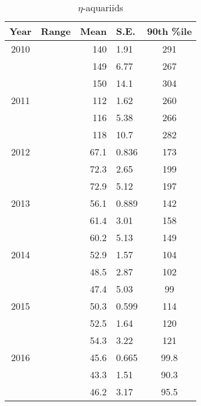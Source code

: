\begin{table}
	\centering
	\begin{tabular}{|c|c|r@{ \,$\pm$\, }l|c|}
		\hline 
		Year & Range & Mean & S.E. & 90th \%ile\\ 
		\hline 
		2010 & & 140 & 1.91 & 291   \\ 
		\hline 
		& &	149 & 6.77 & 267   \\ 
		\hline 
		& & 150 & 14.1 & 304   \\ 
		\hline 
		2011 & & 112 & 1.62 & 260   \\ 
		\hline 
		& & 116 & 5.38 & 266   \\ 
		\hline 
		& & 118 & 10.7 & 282   \\ 
		\hline 
		2012 & & 67.1 & 0.836 & 173   \\ 
		\hline 
		& & 72.3 & 2.65 & 199   \\ 
		\hline 
		& & 72.9 & 5.12 & 197   \\ 
		\hline 
		2013 & & 56.1 & 0.889 & 142   \\ 
		\hline 
		& & 61.4 & 3.01 & 158   \\ 
		\hline 
		& & 60.2 & 5.13 & 149   \\ 
		\hline 
		2014 & & 52.9 & 1.57 & 104   \\ 
		\hline 
		& & 48.5 & 2.87 & 102   \\ 
		\hline 
		& & 47.4 & 5.03 & 99  \\ 
		\hline 
		2015 & & 50.3 & 0.599 & 114   \\ 
		\hline 
		& & 52.5 & 1.64 & 120   \\ 
		\hline 
		& & 54.3 & 3.22 & 121   \\ 
		\hline
		2016 & & 45.6 & 0.665 & 99.8	\\
		\hline 
		& & 43.3 & 1.51 & 90.3   \\ 
		\hline 
		& & 46.2 & 3.17 & 95.5   \\ 
		\hline 
	\end{tabular}
	\caption{$\eta$-aquariids} 
\end{table}
